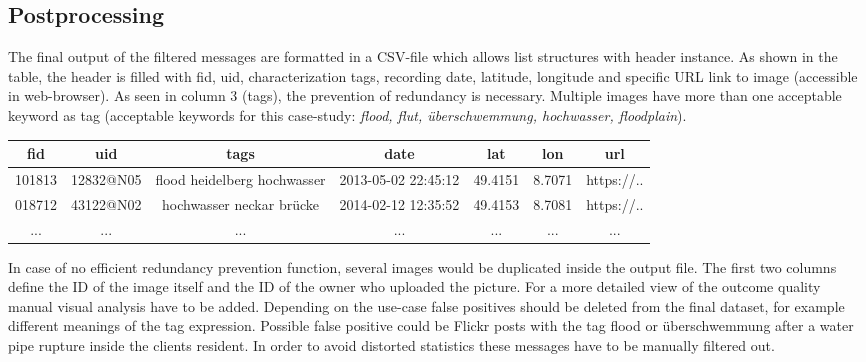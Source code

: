 \subsection{Postprocessing}
The final output of the filtered messages are formatted in a CSV-file which allows list structures with header instance. As shown in the table, the header is filled with fid, uid, characterization tags, recording date, latitude, longitude and specific URL link to image (accessible in web-browser). As seen in column 3 (tags), the prevention of redundancy is necessary. Multiple images have more than one acceptable keyword as tag (acceptable keywords for this case-study: \textit{flood, flut, \"uberschwemmung, hochwasser, floodplain}).

\begin{center}
	\begin{tabular}{ | c | c | c | c | c | c | c |}
	\hline
	\textbf{fid} & \textbf{uid} & \textbf{tags} & \textbf{date} & \textbf{lat} & \textbf{lon} & \textbf{url} \\ \hline
	101813 & 12832@N05 & flood heidelberg hochwasser & 2013-05-02 22:45:12 & 49.4151 & 8.7071 & https://.. \\ \hline
	018712 & 43122@N02 & hochwasser neckar brücke & 2014-02-12 12:35:52 & 49.4153 & 8.7081 & https://.. \\ \hline
	... & ... & ... & ...& ...& ...& ... \\ 
	\end{tabular} 
\end{center}
In case of no efficient redundancy prevention function, several images would be duplicated inside the output file. The first two columns define the ID of the image itself and the ID of the owner who uploaded the picture. For a more detailed view of the outcome quality manual visual analysis have to be added. Depending on the use-case false positives should be deleted from the final dataset, for example different meanings of the tag expression. Possible false positive could be Flickr posts with the tag flood or \"uberschwemmung after a water pipe rupture inside the clients resident. In order to avoid distorted statistics these messages have to be manually filtered out.\\
